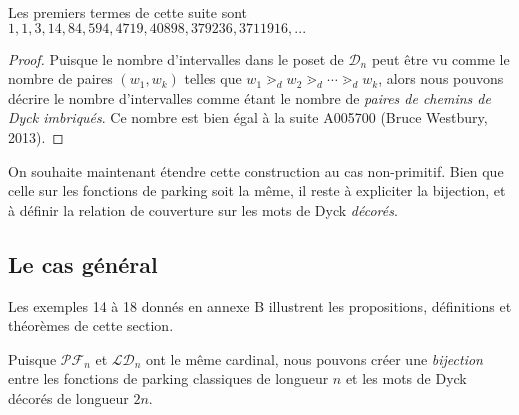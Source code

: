 Les premiers termes de cette suite sont $1, 1, 3, 14, 84,
594, 4719, 40898, 379236, 3711916, ...$\\

\begin{proof}
    Puisque le nombre d'intervalles dans le poset de $\mathcal{D}_n$
    peut être vu comme le nombre de paires $(w_1, w_k)$ telles que
    $w_1 \gtrdot_d w_2 \gtrdot_d \cdots \gtrdot_d w_k$, alors nous pouvons
    décrire le nombre d'intervalles comme étant le nombre de 
    \emph{paires de chemins de Dyck imbriqués}.
    Ce nombre est bien égal à la suite A005700 (Bruce Westbury, 2013).
\end{proof}

On souhaite maintenant étendre cette construction au cas non-primitif.
Bien que celle sur les fonctions de parking soit la même, il
reste à expliciter la bijection, et à définir la relation de couverture
sur les mots de Dyck \emph{décorés}.

\subsection{Le cas général}

Les exemples 14 à 18 donnés en annexe B illustrent les propositions,
définitions et théorèmes de cette section.

\begin{prop}
    Puisque $\mathcal{PF}_n$ et $\mathcal{LD}_n$ ont le même cardinal,
    nous pouvons créer une \emph{bijection} entre les fonctions de parking
    classiques de longueur $n$ et les mots de Dyck décorés de
    longueur $2n$.
\end{prop}

